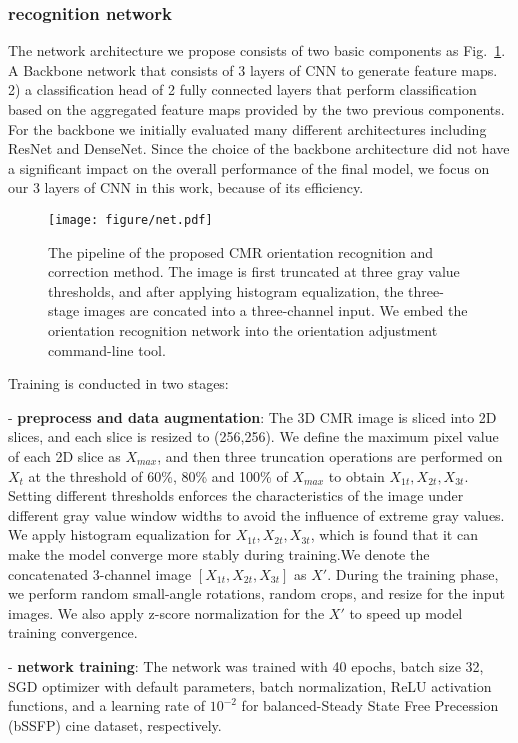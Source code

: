 \documentclass[runningheads]{llncs}
\begin{document}
\subsubsection{recognition network}
The network architecture we propose consists of two basic components as Fig.~\ref{net}. A Backbone network that consists of 3 layers of CNN to generate feature maps. 2) a classification head of 2 fully connected layers that perform classification based on the aggregated feature maps provided by the two previous components. For the backbone we initially evaluated many different architectures including ResNet\cite{resnet} and DenseNet\cite{dense}. Since the choice of the backbone architecture did not have a significant impact on the overall performance of the final model, we focus on our 3 layers of CNN in this work, because of its efficiency.



\begin{figure}
\texttt{[image: figure/net.pdf]}
\caption{The pipeline of the proposed CMR orientation recognition and correction method. The image is first truncated at three gray value thresholds, and after applying histogram equalization, the three-stage images are concated into a three-channel input. We embed the orientation recognition network into the orientation adjustment command-line tool.} \label{net}
\end{figure}


Training is conducted in two stages:

- \textbf{preprocess and data augmentation}: The 3D CMR image is sliced into 2D slices, and each slice is resized to (256,256). We define the maximum pixel value of each 2D slice as $X_{max}$, and then three truncation operations are performed on $X_t$ at the threshold of 60\%, 80\% and 100\% of $X_{max}$ to obtain $X_{1t},X_{2t},X_{3t}$. Setting different thresholds enforces the characteristics of the image under different gray value window widths to avoid the influence of extreme gray values. We apply histogram equalization for $X_{1t},X_{2t},X_{3t}$, which is found that it can make the model converge more stably during training.We denote the concatenated 3-channel image $[X_{1t}, X_{2t}, X_{3t}]$ as $X'$. During the training phase, we perform random small-angle rotations, random crops, and resize for the input images. We also apply z-score normalization for the $X'$ to speed up model training convergence.

- \textbf{network training}: The network was trained with 40 epochs, batch size 32, SGD optimizer with default parameters, batch normalization, ReLU activation functions, and a learning rate of $10^{-2}$ for balanced-Steady State Free Precession (bSSFP) cine dataset, respectively.
\end{document}
